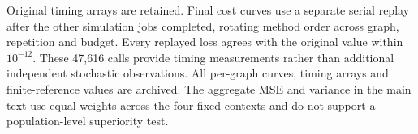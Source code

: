 \documentclass[preprint,11pt,sort&compress]{elsarticle}
\begin{document}
Original timing arrays are retained. Final cost curves use a separate serial replay after the other simulation jobs completed, rotating method order across graph, repetition and budget. Every replayed loss agrees with the original value within $10^{-12}$. These 47,616 calls provide timing measurements rather than additional independent stochastic observations. All per-graph curves, timing arrays and finite-reference values are archived. The aggregate MSE and variance in the main text use equal weights across the four fixed contexts and do not support a population-level superiority test.

\begingroup
\small\setlength{\bibsep}{0pt}


\endgroup
\endgroup
\end{document}
